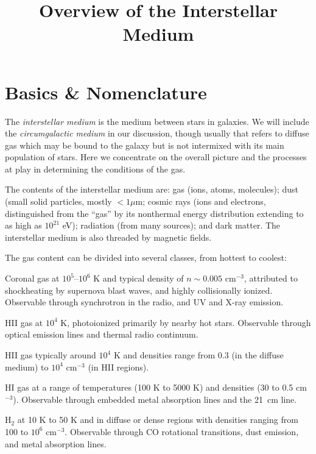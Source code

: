 \title{\bf Overview of the Interstellar Medium}

\section{Basics \& Nomenclature}

The {\it interstellar medium} is the medium between stars in
galaxies. We will include the {\it circumgalactic medium} in our
discussion, though usually that refers to diffuse gas which may be
bound to the galaxy but is not intermixed with its main population of
stars. Here we concentrate on the overall picture and the processes at
play in determining the conditions of the gas.

The contents of the interstellar medium are: gas (ions, atoms,
molecules); dust (small solid particles, mostly $< 1\mu$m; cosmic rays
(ions and electrons, distinguished from the ``gas'' by its nonthermal
energy distribution extending to as high as $10^{21}$ eV); radiation
(from many sources); and dark matter.  The interstellar medium is also
threaded by magnetic fields.

The gas content can be divided into several classes, from hottest to
coolest: 
\begin{ditemize}
\item Coronal gas at $10^{5}$--$10^6$ K and typical density of
$n \sim 0.005$ cm$^{-3}$, attributed to shockheating by supernova
blast waves, and highly collisionally ionized. Observable through
synchrotron in the radio, and UV and X-ray emission.
\item HII gas at $10^4$ K, photoionized primarily by nearby hot
stars. Observable through optical emission lines and thermal radio
continuum.
\item HII gas typically around $10^4$ K and densities range from $0.3$
(in the diffuse medium) to $10^4$ cm$^{-3}$ (in HII regions).
\item HI gas at a range of temperatures (100 K to 5000 K) and
densities (30 to 0.5 cm$^{-3}$). Observable through embedded metal
absorption lines and the 21~cm line.
\item H$_2$ at 10 K to 50 K and in diffuse or dense regions with
densities ranging from 100 to $10^6$ cm$^{-3}$. Observable through CO
rotational transitions, dust emission, and metal absorption lines.
\end{ditemize}

